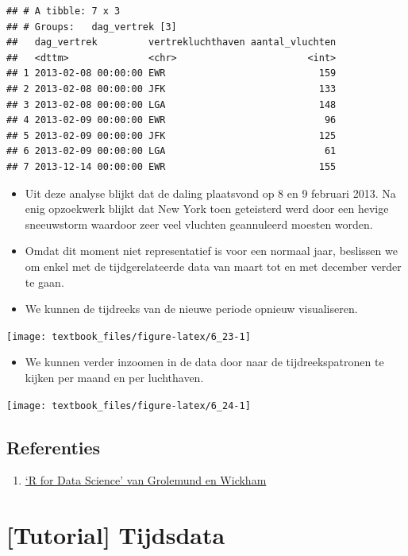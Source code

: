 \documentclass[]{tufte-book}
\providecommand{\tightlist}{%
  \setlength{\itemsep}{0pt}\setlength{\parskip}{0pt}}
\begin{document}
\begin{verbatim}
## # A tibble: 7 x 3
## # Groups:   dag_vertrek [3]
##   dag_vertrek         vertrekluchthaven aantal_vluchten
##   <dttm>              <chr>                       <int>
## 1 2013-02-08 00:00:00 EWR                           159
## 2 2013-02-08 00:00:00 JFK                           133
## 3 2013-02-08 00:00:00 LGA                           148
## 4 2013-02-09 00:00:00 EWR                            96
## 5 2013-02-09 00:00:00 JFK                           125
## 6 2013-02-09 00:00:00 LGA                            61
## 7 2013-12-14 00:00:00 EWR                           155
\end{verbatim}

\begin{itemize}
\item
  Uit deze analyse blijkt dat de daling plaatsvond op 8 en 9 februari 2013. Na enig opzoekwerk blijkt dat New York toen geteisterd werd door een hevige sneeuwstorm waardoor zeer veel vluchten geannuleerd moesten worden.
\item
  Omdat dit moment niet representatief is voor een normaal jaar, beslissen we om enkel met de tijdgerelateerde data van maart tot en met december verder te gaan.
\item
  We kunnen de tijdreeks van de nieuwe periode opnieuw visualiseren.
\end{itemize}

\texttt{[image: textbook\_files/figure-latex/6\_23-1]}

\begin{itemize}
\tightlist
\item
  We kunnen verder inzoomen in de data door naar de tijdreekspatronen te kijken per maand en per luchthaven.
\end{itemize}

\texttt{[image: textbook\_files/figure-latex/6\_24-1]}

\hypertarget{referenties-5}{%
\section{Referenties}\label{referenties-5}}

\begin{enumerate}
\def\labelenumi{\arabic{enumi}.}
\tightlist
\item
  \href{http://r4ds.had.co.nz/}{`R for Data Science' van Grolemund en Wickham}
\end{enumerate}

\hypertarget{tutorial-tijdsdata}{%
\chapter{{[}Tutorial{]} Tijdsdata}\label{tutorial-tijdsdata}}
\end{document}
